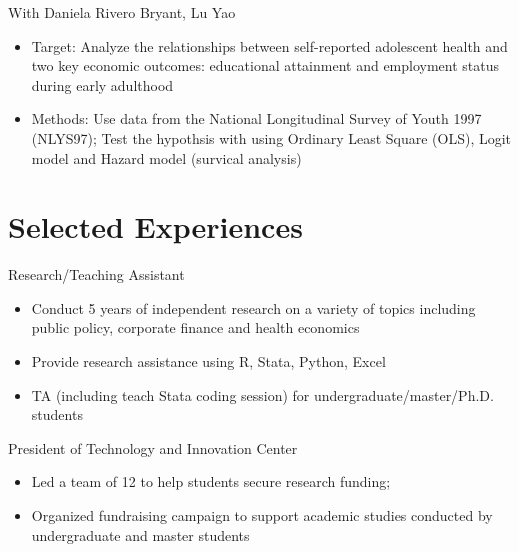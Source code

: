 \documentclass{resume}
\begin{document}
With Daniela Rivero Bryant, Lu Yao
\begin{itemize}
  \item Target: Analyze the relationships between self-reported adolescent health and two key economic outcomes: educational attainment and employment status during early adulthood
  \item Methods: Use data from the National Longitudinal Survey of Youth 1997 (NLYS97); Test the hypothsis with using Ordinary Least Square (OLS), Logit model and Hazard model (survical analysis)
  \end{itemize}

\section{Selected Experiences}
Research/Teaching Assistant
\begin{itemize}
  \item Conduct 5 years of independent research on a variety of topics including public policy, corporate finance and health economics
  \item Provide research assistance using R, Stata, Python, Excel
  \item TA (including teach Stata coding session) for undergraduate/master/Ph.D. students
\end{itemize}


President of Technology and Innovation Center
\begin{itemize}
  \item Led a team of 12 to help students secure research funding;
  \item Organized fundraising campaign to support academic studies conducted by undergraduate and master students
\end{itemize}
\end{document}
